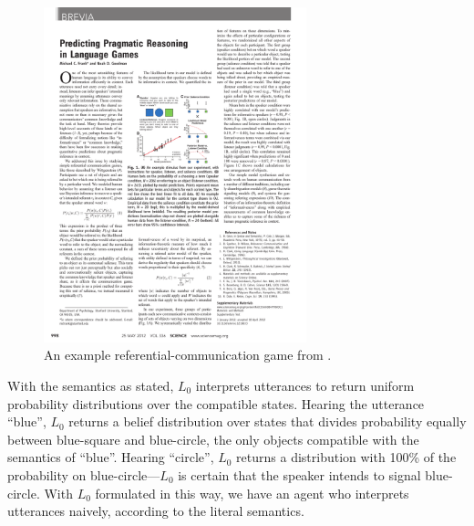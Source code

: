\documentclass{sp}
\begin{document}
\begin{figure}[t]
\centering
\includegraphics[width=3in]{rsa-scene.pdf}
\caption{An example referential-communication game from \cite{frankgoodman2012}.}
\label{ref-game}
\end{figure}

With the semantics as stated, $L_0$ interprets utterances to return uniform probability distributions over the compatible states. Hearing the utterance ``blue'', $L_0$ returns a belief distribution over states that divides probability equally between blue-square and blue-circle, the only objects compatible with the semantics of ``blue''. Hearing ``circle'', $L_0$ returns a distribution with 100\% of the probability on blue-circle---$L_0$ is certain that the speaker intends to signal blue-circle. With $L_0$ formulated in this way, we have an agent who interprets utterances naively, according to the literal semantics.
\end{document}

